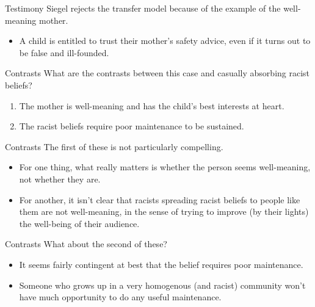 \documentclass[
  17pt,
  letterpaper,
  ignorenonframetext,
  aspectratio=169,
  handout,
  xcolor={dvipsnames}]{beamer}
\providecommand{\tightlist}{%
  \setlength{\itemsep}{0pt}\setlength{\parskip}{0pt}}\usepackage{longtable,booktabs,array}
\begin{document}
\begin{frame}{Testimony}
\protect\hypertarget{testimony-2}{}
Siegel rejects the transfer model because of the example of the
well-meaning mother.

\begin{itemize}[<+->]
\tightlist
\item
  A child is entitled to trust their mother's safety advice, even if it
  turns out to be false and ill-founded.
\end{itemize}
\end{frame}

\begin{frame}{Contrasts}
\protect\hypertarget{contrasts}{}
What are the contrasts between this case and casually absorbing racist
beliefs?

\begin{enumerate}[<+->]
\tightlist
\item
  The mother is well-meaning and has the child's best interests at
  heart.
\item
  The racist beliefs require poor maintenance to be sustained.
\end{enumerate}
\end{frame}

\begin{frame}{Contrasts}
\protect\hypertarget{contrasts-1}{}
The first of these is not particularly compelling.

\begin{itemize}[<+->]
\tightlist
\item
  For one thing, what really matters is whether the person seems
  well-meaning, not whether they are.
\item
  For another, it isn't clear that racists spreading racist beliefs to
  people like them are not well-meaning, in the sense of trying to
  improve (by their lights) the well-being of their audience.
\end{itemize}
\end{frame}

\begin{frame}{Contrasts}
\protect\hypertarget{contrasts-2}{}
What about the second of these?

\begin{itemize}[<+->]
\tightlist
\item
  It seems fairly contingent at best that the belief requires poor
  maintenance.
\item
  Someone who grows up in a very homogenous (and racist) community won't
  have much opportunity to do any useful maintenance.
\end{itemize}
\end{frame}
\end{document}
